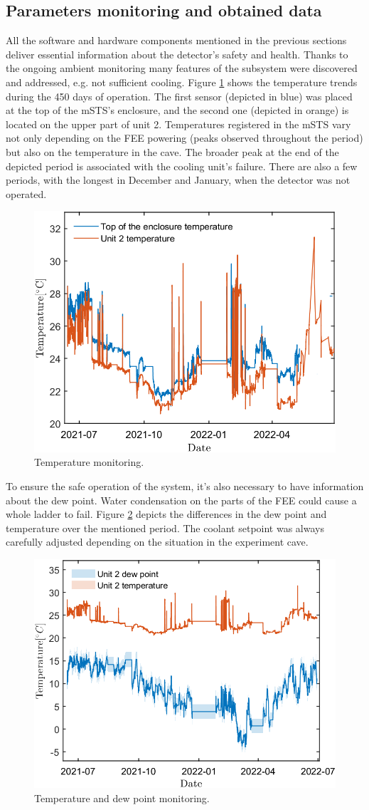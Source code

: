 \subsection{Parameters monitoring and obtained data}
All the software and hardware components mentioned in the previous sections deliver essential information about the detector's safety and health. Thanks to the ongoing ambient monitoring many features of the subsystem were discovered and addressed, e.g. not sufficient cooling. Figure \ref{fig_temp} shows the temperature trends during the 450 days of operation. The first sensor (depicted in blue) was placed at the top of the \gls{mSTS}'s enclosure, and the second one (depicted in orange) is located on the upper part of unit 2. Temperatures registered in the \gls{mSTS} vary not only depending on the \gls{FEE} powering (peaks observed throughout the period) but also on the temperature in the cave. The broader peak at the end of the depicted period is associated with the cooling unit's failure.  There are also a few periods, with the longest in December and January, when the detector was not operated. 

\begin{figure}[!h]
\centering
\includegraphics[width=0.55\columnwidth]{Chapter6/DCS/images/temp2.png}
\caption{Temperature monitoring.}
\label{fig_temp}
\end{figure}

To ensure the safe operation of the system, it's also necessary to have information about the dew point. Water condensation on the parts of the \gls{FEE} could cause a whole ladder to fail. Figure \ref{fig_dew} depicts the differences in the dew point and temperature over the mentioned period. The coolant setpoint was always carefully adjusted depending on the situation in the experiment cave. 
\newpage
\begin{figure}[!h]
\centering
\includegraphics[width=0.55\columnwidth]{Chapter6/DCS/images/dew.png}
\caption{Temperature and dew point monitoring.}
\label{fig_dew}
\end{figure}


